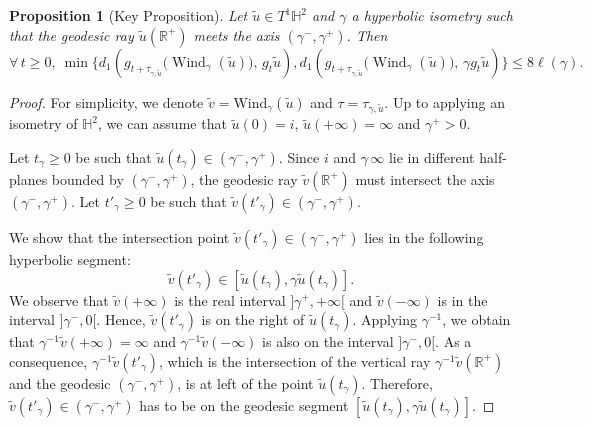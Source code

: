 \documentclass[a4paper,english,reqno]{amsart}
\newcommand{\R}{\mathbb{R}}
\newtheorem{proposition}{Proposition}
\theoremstyle{definition}
\numberwithin{equation}{section}
\begin{document}
 
 \begin{proposition}[Key Proposition]\label{key_prop} 
 	Let $\tilde{u}\in T^{1}\mathbb{H}^{2}$ and $\gamma$ a hyperbolic isometry such that the geodesic ray $\tilde u(\R^+)$ meets the axis $(\gamma^-,\gamma^+)$. Then
 	\[\forall\, t\geq0, ~
 	\min \{ d_1\!\left(g_{t+\tau_{\gamma,\tilde u}}\bigl(\operatorname{Wind}_{\gamma}(\tilde u)\bigr),\, g_t\tilde u\right),
 	d_1\!\left(g_{t+\tau_{\gamma,\tilde u}}\bigl(\operatorname{Wind}_{\gamma}(\tilde u)\bigr),\, \gamma g_t\tilde u\right)
 	\}
 	\le 8 \ell(\gamma).
 	\]
 \end{proposition}
 \begin{proof}
 	For simplicity, we denote $\tilde v=\mathrm{Wind}_{\gamma}(\tilde u)$ and $\tau=\tau_{\gamma,\tilde u}$.
 	Up to applying an isometry of $\mathbb{H}^2$, we can assume that $\tilde u(0)=i$, $\tilde u(+\infty)=\infty$ and $\gamma^{+}>0$.
 	
 	Let $t_\gamma\ge 0$ be such that $\tilde u(t_\gamma)\in(\gamma^{-},\gamma^{+})$. Since $i$ and $\gamma \, \infty$ lie in different half-planes bounded by $(\gamma^{-},\gamma^{+})$, the geodesic ray $\tilde v(\mathbb R^{+})$ must intersect the axis $(\gamma^{-},\gamma^{+})$. Let $t'_\gamma\ge 0$ be such that $\tilde v(t'_\gamma)\in(\gamma^{-},\gamma^{+})$.
 	
 	We show that the intersection point $\tilde v(t'_\gamma)\in(\gamma^{-},\gamma^{+})$ lies in the following hyperbolic segment:
 	\[\tilde v(t'_\gamma)\in
 	[\tilde{u}(t_\gamma), \gamma \tilde{u}(t_\gamma)].
 	\]
 	We observe that $\tilde v(+\infty)$ is the real interval $]\gamma^+, +\infty[$ and $\tilde v(-\infty)$ is in the interval $]\gamma^-,0[$. Hence, $\tilde v(t'_\gamma)$ is on the right of $\tilde u(t_\gamma)$.  Applying $\gamma^{-1}$, we obtain that $\gamma^{-1} \tilde v (+\infty) = \infty$ and $\gamma^{-1} \tilde v (-\infty)$ is also on the interval $]\gamma^-,0[$. As a consequence, $\gamma^{-1} \tilde v(t'_\gamma)$, which is the intersection of the vertical ray $\gamma^{-1}\tilde{v}(\mathbb{R}^+)$ and the geodesic $(\gamma^{-}, \gamma^{+})$, is at left of the point $\tilde{u}(t_\gamma)$.
 	Therefore, $\tilde v(t'_\gamma)\in(\gamma^{-},\gamma^{+})$ has to be on the geodesic segment
 	$[\tilde{u}(t_\gamma), \gamma \tilde{u}(t_\gamma)]$. %
 	

\end{proof}
\end{document}
